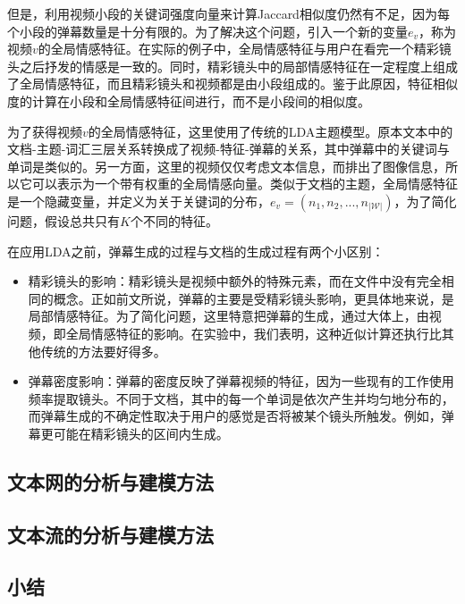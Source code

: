 但是，利用视频小段的关键词强度向量来计算Jaccard相似度仍然有不足，因为每个小段的弹幕数量是十分有限的。为了解决这个问题，引入一个新的变量$e_v$，称为视频$v$的全局情感特征。在实际的例子中，全局情感特征与用户在看完一个精彩镜头之后抒发的情感是一致的。同时，精彩镜头中的局部情感特征在一定程度上组成了全局情感特征，而且精彩镜头和视频都是由小段组成的。鉴于此原因，特征相似度的计算在小段和全局情感特征间进行，而不是小段间的相似度。

为了获得视频$v$的全局情感特征，这里使用了传统的LDA主题模型。原本文本中的文档-主题-词汇三层关系转换成了视频-特征-弹幕的关系，其中弹幕中的关键词与单词是类似的。另一方面，这里的视频仅仅考虑文本信息，而排出了图像信息，所以它可以表示为一个带有权重的全局情感向量。类似于文档的主题，全局情感特征是一个隐藏变量，并定义为关于关键词的分布，$e_v=(n_1, n_2,...,n_{|\mathcal{W}|})$，为了简化问题，假设总共只有$K$个不同的特征。

在应用LDA之前，弹幕生成的过程与文档的生成过程有两个小区别：
\begin{itemize}
\item 精彩镜头的影响：精彩镜头是视频中额外的特殊元素，而在文件中没有完全相同的概念。正如前文所说，弹幕的主要是受精彩镜头影响，更具体地来说，是局部情感特征。为了简化问题，这里特意把弹幕的生成，通过大体上，由视频，即全局情感特征的影响。在实验中，我们表明，这种近似计算还执行比其他传统的方法要好得多。
\item 弹幕密度影响：弹幕的密度反映了弹幕视频的特征，因为一些现有的工作使用频率提取镜头。不同于文档，其中的每一个单词是依次产生并均匀地分布的，而弹幕生成的不确定性取决于用户的感觉是否将被某个镜头所触发。例如，弹幕更可能在精彩镜头的区间内生成。 
\end{itemize}



\subsection{文本网的分析与建模方法}

\subsection{文本流的分析与建模方法}

\subsection{小结}
